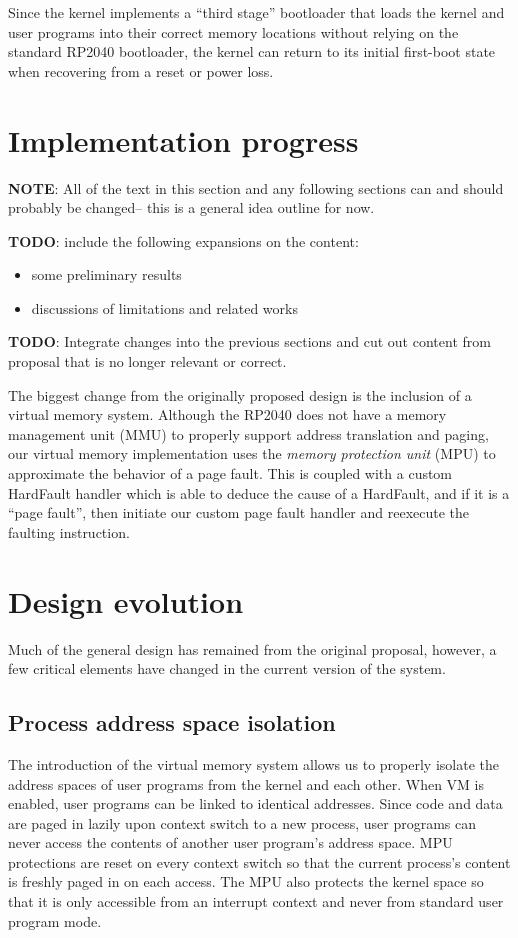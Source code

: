 \documentclass[12pt]{article}
\begin{document}
Since the kernel implements a ``third stage'' bootloader that loads the kernel
and user programs into their correct memory locations without relying on the
standard RP2040 bootloader, the kernel can return to its initial first-boot
state when recovering from a reset or power loss.

\section{Implementation progress}
\textbf{NOTE}: All of the text in this section and any following sections can
and should probably be changed-- this is a general idea outline for now.

\textbf{TODO}: include the following expansions on the content:

\begin{itemize}
    \item some preliminary results 
    \item discussions of limitations and related works
\end{itemize}

\textbf{TODO}: Integrate changes into the previous sections and cut out content
from proposal that is no longer relevant or correct.
\vspace{1em}

The biggest change from the originally proposed design is the inclusion of a
virtual memory system. Although the RP2040 does not have a memory management
unit (MMU) to properly support address translation and paging, our virtual
memory implementation uses the \emph{memory protection unit} (MPU) to
approximate the behavior of a page fault. This is coupled with a custom
HardFault handler which is able to deduce the cause of a HardFault, and if it
is a ``page fault'', then initiate our custom page fault handler and reexecute
the faulting instruction.


\section{Design evolution}
Much of the general design has remained from the original proposal, however, a
few critical elements have changed in the current version of the system.

\subsection{Process address space isolation}
The introduction of the virtual memory system allows us to properly isolate
the address spaces of user programs from the kernel and each other. When VM is
enabled, user programs can be linked to identical addresses. Since code and data
are paged in lazily upon context switch to a new process, user programs can
never access the contents of another user program's address space. MPU
protections are reset on every context switch so that the current process's
content is freshly paged in on each access. The MPU also protects the kernel
space so that it is only accessible from an interrupt context and never from
standard user program mode.
\end{document}

